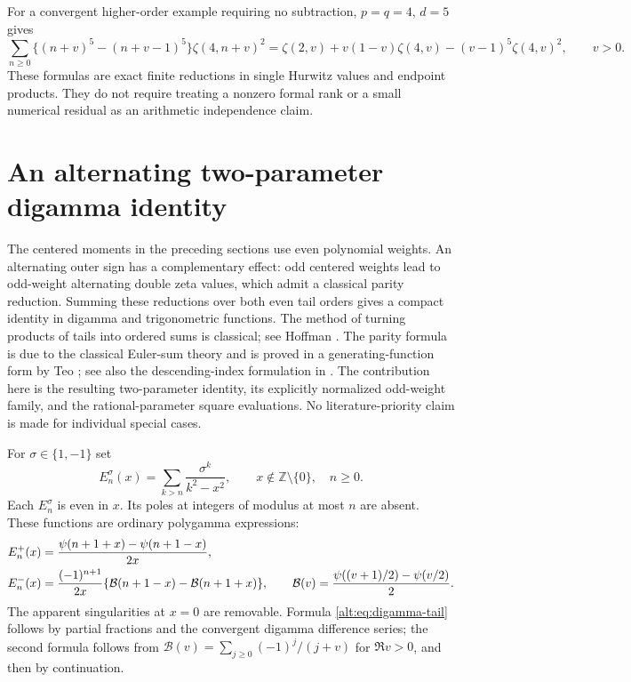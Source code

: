\documentclass[11pt]{article}
\theoremstyle{definition}
\theoremstyle{remark}
\numberwithin{equation}{section}
\begin{document}
For a convergent higher-order example requiring no subtraction,
$p=q=4$, $d=5$ gives
\begin{equation}\label{sh:fourthsquare}
 \sum_{n\ge0}\{(n+v)^5-(n+v-1)^5\}\zeta(4,n+v)^2
 =\zeta(2,v)+v(1-v)\zeta(4,v)
                   -(v-1)^5\zeta(4,v)^2,
 \qquad v>0.
\end{equation}
These formulas are exact finite reductions in single Hurwitz values
and endpoint products.  They do not require treating a nonzero formal
rank or a small numerical residual as an arithmetic independence claim.


\section{An alternating two-parameter digamma identity}
\label{alt:sec:master}

The centered moments in the preceding sections use even polynomial weights.
An alternating outer sign has a complementary effect: odd centered weights
lead to odd-weight alternating double zeta values, which admit a classical
parity reduction. Summing these reductions over both even tail orders gives
a compact identity in digamma and trigonometric functions. The method of
turning products of tails into ordered sums is classical; see Hoffman
\cite{Hoffman}. The parity formula is due to the classical Euler-sum
theory and is proved in a generating-function form by Teo
\cite{Teo}; see also the descending-index formulation in
\cite[Eq.~(3.7)]{XuWang}. The contribution here is the resulting
two-parameter identity, its explicitly normalized odd-weight family, and
the rational-parameter square evaluations. No literature-priority claim
is made for individual special cases.

For $\sigma\in\{1,-1\}$ set
\begin{equation}\label{alt:eq:resolvent-tail}
 E_n^\sigma(x)=\sum_{k>n}\frac{\sigma^k}{k^2-x^2},
 \qquad x\notin\mathbb Z\setminus\{0\},\quad n\ge0.
\end{equation}
Each $E_n^\sigma$ is even in $x$. Its poles at integers of modulus at
most $n$ are absent. These functions are ordinary polygamma expressions:
\begin{align}
 E_n^+(x)&=\frac{\psi(n+1+x)-\psi(n+1-x)}{2x},
 \label{alt:eq:digamma-tail}\\
 E_n^-(x)&=\frac{(-1)^{n+1}}{2x}
       \{\mathcal B(n+1-x)-\mathcal B(n+1+x)\},
 \qquad
 \mathcal B(v)=\frac{\psi((v+1)/2)-\psi(v/2)}2.
 \notag
\end{align}
The apparent singularities at $x=0$ are removable. Formula
\eqref{alt:eq:digamma-tail} follows by partial fractions and the
convergent digamma difference series; the second formula follows from
$\mathcal B(v)=\sum_{j\ge0}(-1)^j/(j+v)$ for $\Re v>0$,
and then by continuation.
\end{document}
